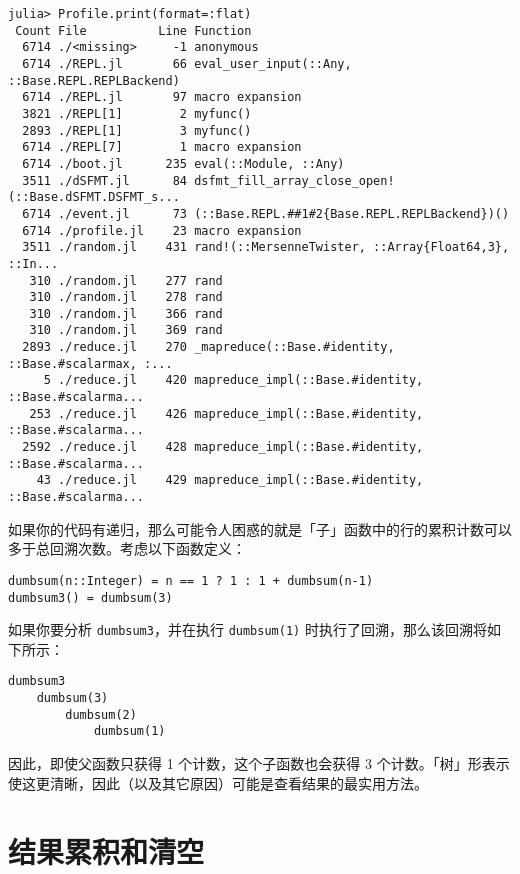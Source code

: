 \begin{verbatim}
julia> Profile.print(format=:flat)
 Count File          Line Function
  6714 ./<missing>     -1 anonymous
  6714 ./REPL.jl       66 eval_user_input(::Any, ::Base.REPL.REPLBackend)
  6714 ./REPL.jl       97 macro expansion
  3821 ./REPL[1]        2 myfunc()
  2893 ./REPL[1]        3 myfunc()
  6714 ./REPL[7]        1 macro expansion
  6714 ./boot.jl      235 eval(::Module, ::Any)
  3511 ./dSFMT.jl      84 dsfmt_fill_array_close_open!(::Base.dSFMT.DSFMT_s...
  6714 ./event.jl      73 (::Base.REPL.##1#2{Base.REPL.REPLBackend})()
  6714 ./profile.jl    23 macro expansion
  3511 ./random.jl    431 rand!(::MersenneTwister, ::Array{Float64,3}, ::In...
   310 ./random.jl    277 rand
   310 ./random.jl    278 rand
   310 ./random.jl    366 rand
   310 ./random.jl    369 rand
  2893 ./reduce.jl    270 _mapreduce(::Base.#identity, ::Base.#scalarmax, :...
     5 ./reduce.jl    420 mapreduce_impl(::Base.#identity, ::Base.#scalarma...
   253 ./reduce.jl    426 mapreduce_impl(::Base.#identity, ::Base.#scalarma...
  2592 ./reduce.jl    428 mapreduce_impl(::Base.#identity, ::Base.#scalarma...
    43 ./reduce.jl    429 mapreduce_impl(::Base.#identity, ::Base.#scalarma...
\end{verbatim}



如果你的代码有递归，那么可能令人困惑的就是「子」函数中的行的累积计数可以多于总回溯次数。考虑以下函数定义：




\begin{verbatim}
dumbsum(n::Integer) = n == 1 ? 1 : 1 + dumbsum(n-1)
dumbsum3() = dumbsum(3)
\end{verbatim}



如果你要分析 \texttt{dumbsum3}，并在执行 \texttt{dumbsum(1)} 时执行了回溯，那么该回溯将如下所示：




\begin{verbatim}
dumbsum3
    dumbsum(3)
        dumbsum(2)
            dumbsum(1)
\end{verbatim}



因此，即使父函数只获得 1 个计数，这个子函数也会获得 3 个计数。「树」形表示使这更清晰，因此（以及其它原因）可能是查看结果的最实用方法。



\hypertarget{11920246320852784321}{}


\section{结果累积和清空}




